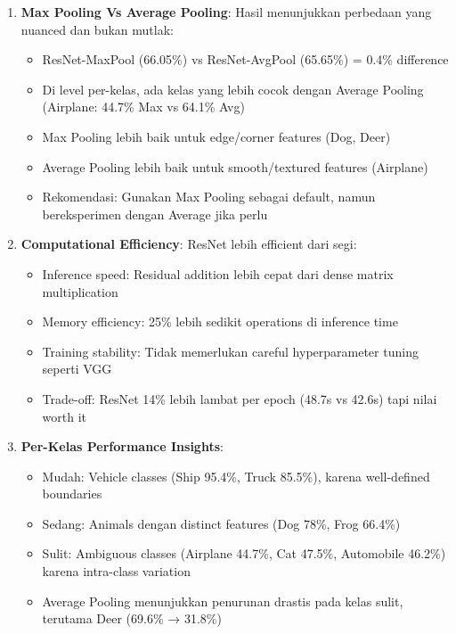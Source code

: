 \documentclass[12pt,a4paper]{report}
\begin{document}
\begin{enumerate}
    \item \textbf{Max Pooling Vs Average Pooling}: Hasil menunjukkan perbedaan yang nuanced dan bukan mutlak:
    \begin{itemize}
        \item ResNet-MaxPool (66.05\%) vs ResNet-AvgPool (65.65\%) = 0.4\% difference
        \item Di level per-kelas, ada kelas yang lebih cocok dengan Average Pooling (Airplane: 44.7\% Max vs 64.1\% Avg)
        \item Max Pooling lebih baik untuk edge/corner features (Dog, Deer)
        \item Average Pooling lebih baik untuk smooth/textured features (Airplane)
        \item Rekomendasi: Gunakan Max Pooling sebagai default, namun bereksperimen dengan Average jika perlu
    \end{itemize}
    
    \item \textbf{Computational Efficiency}: ResNet lebih efficient dari segi:
    \begin{itemize}
        \item Inference speed: Residual addition lebih cepat dari dense matrix multiplication
        \item Memory efficiency: 25\% lebih sedikit operations di inference time
        \item Training stability: Tidak memerlukan careful hyperparameter tuning seperti VGG
        \item Trade-off: ResNet 14\% lebih lambat per epoch (48.7s vs 42.6s) tapi nilai worth it
    \end{itemize}
    
    \item \textbf{Per-Kelas Performance Insights}:
    \begin{itemize}
        \item Mudah: Vehicle classes (Ship 95.4\%, Truck 85.5\%), karena well-defined boundaries
        \item Sedang: Animals dengan distinct features (Dog 78\%, Frog 66.4\%)
        \item Sulit: Ambiguous classes (Airplane 44.7\%, Cat 47.5\%, Automobile 46.2\%) karena intra-class variation
        \item Average Pooling menunjukkan penurunan drastis pada kelas sulit, terutama Deer (69.6\% → 31.8\%)
    \end{itemize}
\end{enumerate}
\end{document}

